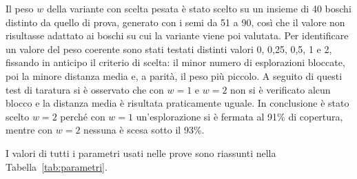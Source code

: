 Il peso $w$ della variante con scelta pesata è stato scelto su un insieme di 40 boschi distinto da quello di prova, generato con i semi da 51 a 90, così che il valore non risultasse adattato ai boschi su cui la variante viene poi valutata. Per identificare un valore del peso coerente sono stati testati distinti valori 0, 0,25, 0,5, 1 e 2, fissando in anticipo il criterio di scelta: il minor numero di esplorazioni bloccate, poi la minore distanza media e, a parità, il peso più piccolo. A seguito di questi test di taratura si è osservato che con $w = 1$ e $w = 2$ non si è verificato alcun blocco e la distanza media è risultata praticamente uguale. In conclusione è stato scelto $w = 2$ perché con $w = 1$ un'esplorazione si è fermata al 91\% di copertura, mentre con $w = 2$ nessuna è scesa sotto il 93\%.

I valori di tutti i parametri usati nelle prove sono riassunti nella Tabella~\ref{tab:parametri}.

